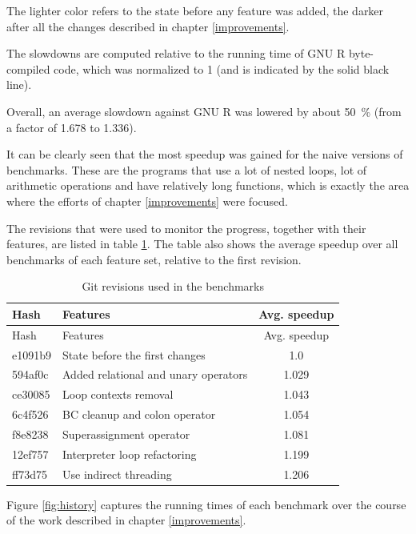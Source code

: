 The lighter color refers to the state before any feature was added, the darker after all the changes described in chapter \ref{improvements}.

The slowdowns are computed relative to the running time of GNU R byte-compiled code, which was normalized to 1 (and is indicated by the solid black line).

Overall, an average slowdown against GNU R was lowered by about 50~\% (from a factor of 1.678 to 1.336).

It can be clearly seen that the most speedup was gained for the naive versions of benchmarks. These are the programs that use a lot of nested loops, lot of arithmetic operations and have relatively long functions, which is exactly the area where the efforts of chapter \ref{improvements} were focused.

The revisions that were used to monitor the progress, together with their features, are listed in table \ref{tab:git-rev}. The table also shows the average speedup over all benchmarks of each feature set, relative to the first revision.

\begin{longtable}[c]{@{}llc@{}}
\caption{Git revisions used in the benchmarks\label{tab:git-rev}} \tabularnewline
\toprule
Hash & Features & Avg. speedup \tabularnewline
\midrule
\endfirsthead
\toprule
Hash & Features & Avg. speedup \tabularnewline
\midrule
\endhead
e1091b9 & State before the first changes & 1.0 \tabularnewline
594af0c & Added relational and unary operators & 1.029 \tabularnewline
ce30085 & Loop contexts removal & 1.043 \tabularnewline
6c4f526 & BC cleanup and colon operator & 1.054 \tabularnewline
f8e8238 & Superassignment operator & 1.081 \tabularnewline
12ef757 & Interpreter loop refactoring & 1.199 \tabularnewline
ff73d75 & Use indirect threading & 1.206 \tabularnewline
\bottomrule
\end{longtable}

Figure \ref{fig:history} captures the running times of each benchmark over the course of the work described in chapter \ref{improvements}.

